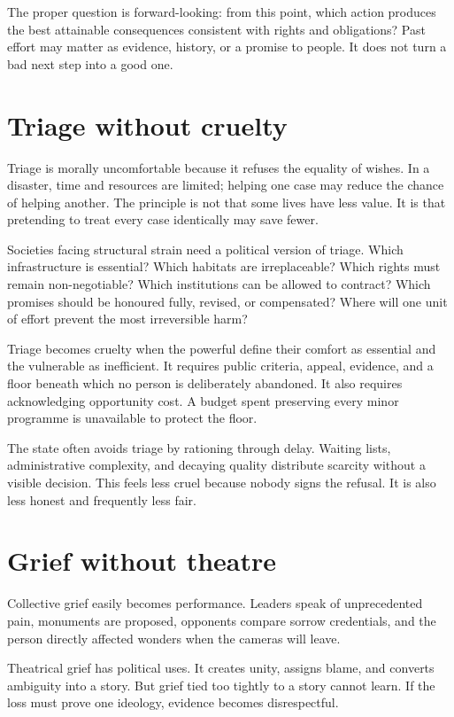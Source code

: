 \documentclass[12pt,a4paper]{book}
\begin{document}
The proper question is forward-looking: from this point, which action produces
the best attainable consequences consistent with rights and obligations?  Past
effort may matter as evidence, history, or a promise to people.  It does not
turn a bad next step into a good one.

\section{Triage without cruelty}

Triage is morally uncomfortable because it refuses the equality of wishes.  In
a disaster, time and resources are limited; helping one case may reduce the
chance of helping another.  The principle is not that some lives have less
value.  It is that pretending to treat every case identically may save fewer.

Societies facing structural strain need a political version of triage.  Which
infrastructure is essential?  Which habitats are irreplaceable?  Which rights
must remain non-negotiable?  Which institutions can be allowed to contract?
Which promises should be honoured fully, revised, or compensated?  Where will
one unit of effort prevent the most irreversible harm?

Triage becomes cruelty when the powerful define their comfort as essential and
the vulnerable as inefficient.  It requires public criteria, appeal, evidence,
and a floor beneath which no person is deliberately abandoned.  It also
requires acknowledging opportunity cost.  A budget spent preserving every
minor programme is unavailable to protect the floor.

The state often avoids triage by rationing through delay.  Waiting lists,
administrative complexity, and decaying quality distribute scarcity without a
visible decision.  This feels less cruel because nobody signs the refusal.  It
is also less honest and frequently less fair.

\section{Grief without theatre}

Collective grief easily becomes performance.  Leaders speak of unprecedented
pain, monuments are proposed, opponents compare sorrow credentials, and the
person directly affected wonders when the cameras will leave.

Theatrical grief has political uses.  It creates unity, assigns blame, and
converts ambiguity into a story.  But grief tied too tightly to a story cannot
learn.  If the loss must prove one ideology, evidence becomes disrespectful.
\end{document}
